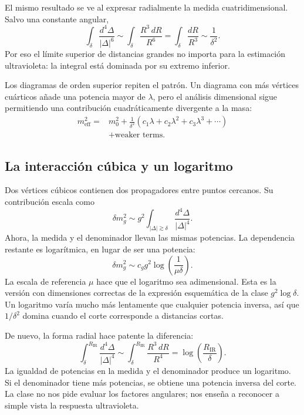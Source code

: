 El mismo resultado se ve al expresar radialmente la medida cuatridimensional. Salvo una constante angular,
\begin{equation}
\int_{\delta}\frac{d^4\Delta}{|\Delta|^6}
\sim
\int_{\delta}\frac{R^3\,dR}{R^6}
=\int_{\delta}\frac{dR}{R^3}
\sim\frac{1}{\delta^2}.
\end{equation}
Por eso el límite superior de distancias grandes no importa para la estimación ultravioleta: la integral está dominada por su extremo inferior.

Los diagramas de orden superior repiten el patrón. Un diagrama con más vértices cuárticos añade una potencia mayor de \(\lambda\), pero el análisis dimensional sigue permitiendo una contribución cuadráticamente divergente a la masa:
\begin{equation}
\begin{aligned}
m_{\mathrm{eff}}^2
={}&m_0^2
+\frac{1}{\delta^2}
\left(c_1\lambda+c_2\lambda^2+c_3\lambda^3+\cdots\right)\\
&+\text{weaker terms}.
\end{aligned}
\label{eq:scalar-mass-series}
\end{equation}

\subsection{La interacción cúbica y un logaritmo}

Dos vértices cúbicos contienen dos propagadores entre puntos cercanos. Su contribución escala como
\begin{equation}
\delta m_g^2
\sim
g^2\int_{|\Delta|\gtrsim\delta}
\frac{d^4\Delta}{|\Delta|^4}.
\label{eq:cubic-loop}
\end{equation}
Ahora, la medida y el denominador llevan las mismas potencias. La dependencia restante es logarítmica, en lugar de ser una potencia:
\begin{equation}
\delta m_g^2
\sim
c_g g^2\log\!\left(\frac{1}{\mu\delta}\right).
\label{eq:cubic-log}
\end{equation}
La escala de referencia \(\mu\) hace que el logaritmo sea adimensional. Esta es la versión con dimensiones correctas de la expresión esquemática de la clase \(g^2\log\delta\). Un logaritmo varía mucho más lentamente que cualquier potencia inversa, así que \(1/\delta^2\) domina cuando el corte corresponde a distancias cortas.

De nuevo, la forma radial hace patente la diferencia:
\begin{equation}
\int_{\delta}^{R_{\mathrm{IR}}}
\frac{d^4\Delta}{|\Delta|^4}
\sim
\int_{\delta}^{R_{\mathrm{IR}}}\frac{R^3\,dR}{R^4}
=\log\!\left(\frac{R_{\mathrm{IR}}}{\delta}\right).
\end{equation}
La igualdad de potencias en la medida y el denominador produce un logaritmo. Si el denominador tiene más potencias, se obtiene una potencia inversa del corte. La clase no nos pide evaluar los factores angulares; nos enseña a reconocer a simple vista la respuesta ultravioleta.

